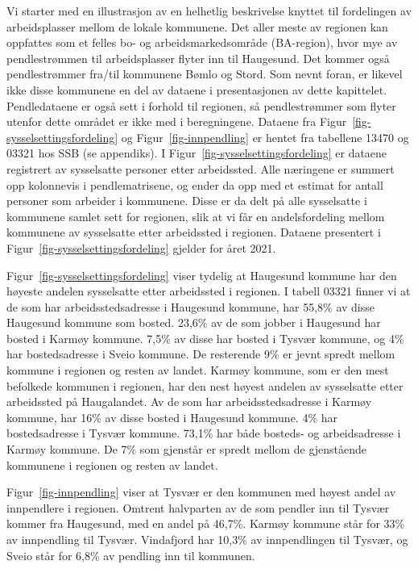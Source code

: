 \documentclass[
]{article}
\begin{document}
Vi starter med en illustrasjon av en helhetlig beskrivelse knyttet til
fordelingen av arbeidsplasser mellom de lokale kommunene. Det aller
meste av regionen kan oppfattes som et felles bo- og
arbeidsmarkedsområde (BA-region), hvor mye av pendlestrømmen til
arbeidsplasser flyter inn til Haugesund. Det kommer også pendlestrømmer
fra/til kommunene Bømlo og Stord. Som nevnt foran, er likevel ikke disse
kommunene en del av dataene i presentasjonen av dette kapittelet.
Pendledataene er også sett i forhold til regionen, så pendlestrømmer som
flyter utenfor dette området er ikke med i beregningene. Dataene fra
Figur~\ref{fig-sysselsettingsfordeling} og Figur~\ref{fig-innpendling}
er hentet fra tabellene 13470 og 03321 hos SSB (se appendiks). I
Figur~\ref{fig-sysselsettingsfordeling} er dataene registrert av
sysselsatte personer etter arbeidssted. Alle næringene er summert opp
kolonnevis i pendlematrisene, og ender da opp med et estimat for antall
personer som arbeider i kommunene. Disse er da delt på alle sysselsatte
i kommunene samlet sett for regionen, slik at vi får en andelsfordeling
mellom kommunene av sysselsatte etter arbeidssted i regionen. Dataene
presentert i Figur~\ref{fig-sysselsettingsfordeling} gjelder for året
2021.

Figur~\ref{fig-sysselsettingsfordeling} viser tydelig at Haugesund
kommune har den høyeste andelen sysselsatte etter arbeidssted i
regionen. I tabell 03321 finner vi at de som har arbeidsstedsadresse i
Haugesund kommune, har 55,8\% av disse Haugesund kommune som bosted.
23,6\% av de som jobber i Haugesund har bosted i Karmøy kommune. 7,5\%
av disse har bosted i Tysvær kommune, og 4\% har bostedsadresse i Sveio
kommune. De resterende 9\% er jevnt spredt mellom kommune i regionen og
resten av landet. Karmøy kommune, som er den mest befolkede kommunen i
regionen, har den nest høyest andelen av sysselsatte etter arbeidssted
på Haugalandet. Av de som har arbeidsstedsadresse i Karmøy kommune, har
16\% av disse bosted i Haugesund kommune. 4\% har bostedsadresse i
Tysvær kommune. 73,1\% har både bosteds- og arbeidsadresse i Karmøy
kommune. De 7\% som gjenstår er spredt mellom de gjenstående kommunene i
regionen og resten av landet.

Figur~\ref{fig-innpendling} viser at Tysvær er den kommunen med høyest
andel av innpendlere i regionen. Omtrent halvparten av de som pendler
inn til Tysvær kommer fra Haugesund, med en andel på 46,7\%. Karmøy
kommune står for 33\% av innpendling til Tysvær. Vindafjord har 10,3\%
av innpendlingen til Tysvær, og Sveio står for 6,8\% av pendling inn til
kommunen.
\end{document}
